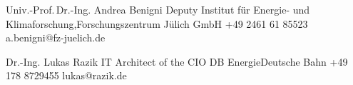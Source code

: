 \begin{cvReferences}

\cvRefereeNameOne%
    {Univ.-Prof.\,Dr.-Ing. Andrea Benigni}%
    {Deputy}%
    {Institut f{\"u}r Energie- und Klimaforschung,\newline Forschungszentrum J{\"u}lich GmbH}%
    {+49 2461 61 85523}%
    {a.benigni@fz-juelich.de}%

\cvRefereeNameTwo%
    {Dr.-Ing. Lukas Razik}%
    {IT Architect of the CIO}%
    {DB Energie\newline Deutsche Bahn}%
    {+49 178 8729455}%
    {lukas@razik.de}%

\cvRefereeFlush



\end{cvReferences}
